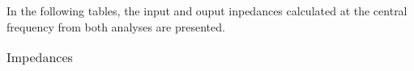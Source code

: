 In the following tables, the input and ouput inpedances  calculated at the central frequency from both analyses are presented.\\
\FloatBarrier
\begin{table}[h]
  \centering
  \begin{tabular}{|c|c|c|}
    \hline    
    
    
    
    \hline
  \end{tabular}
  \caption{Impedances}
\end{table}
\FloatBarrier   



